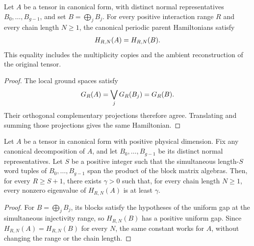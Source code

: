 \begin{lemma}
    \label{thm:canonical-parent-hamiltonian-representatives}
    \leanok
    Let $A$ be a tensor in canonical form, with distinct normal
    representatives $B_0,\ldots,B_{g-1}$, and set $B=\bigoplus_j B_j$.
    For every positive interaction range $R$ and every chain length $N\geq1$,
    the canonical periodic parent Hamiltonians satisfy
    \begin{align}
        H_{R,N}(A)=H_{R,N}(B).\notag
    \end{align}
    This equality includes the multiplicity copies and the ambient
    reconstruction of the original tensor.
\end{lemma}
\begin{proof}\leanok
    The local ground spaces satisfy
    \begin{align}
        G_R(A)=\bigvee_jG_R(B_j)=G_R(B).\notag
    \end{align}
    Their orthogonal complementary projections therefore agree. Translating
    and summing those projections gives the same Hamiltonian.
\end{proof}

\begin{lemma}
    \label{thm:canonical-decomposition-gap-simultaneous-injectivity}
    \leanok
    Let $A$ be a tensor in canonical form with positive physical dimension.
    Fix any canonical decomposition of
    $A$, and let $B_0,\ldots,B_{g-1}$ be its distinct normal representatives.
    Let $S$ be a positive integer such that the simultaneous length-$S$ word
    tuples of $B_0,\ldots,B_{g-1}$ span the product of the block matrix
    algebras. Then, for every $R\geq S+1$, there exists $\gamma>0$ such that,
    for every chain length $N\geq1$, every nonzero eigenvalue of
    $H_{R,N}(A)$ is at least $\gamma$.
\end{lemma}
\begin{proof}\leanok
    For $B=\bigoplus_jB_j$, its blocks satisfy the hypotheses of the uniform
    gap at the simultaneous injectivity range, so $H_{R,N}(B)$ has a positive
    uniform gap. Since $H_{R,N}(A)=H_{R,N}(B)$ for every $N$, the same
    constant works for $A$, without changing the range or the chain length.
\end{proof}


